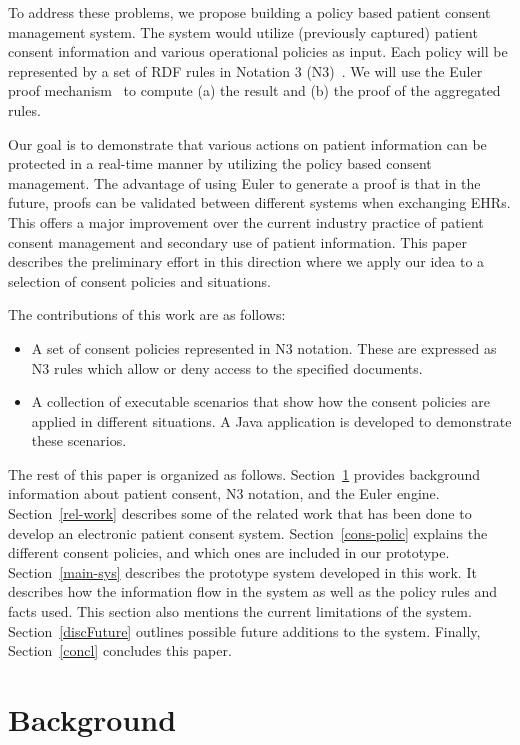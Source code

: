 \documentclass[conference]{IEEEtran}
\begin{document}
To address these problems, we propose building a policy based patient consent management system. The system would utilize (previously captured) patient consent
information and various operational policies as input. Each policy will be represented by a set of RDF rules in Notation 3 (N3)~\cite{N3not}.  We will use the
Euler proof mechanism~\cite{eurlorprf} to compute (a) the result and (b) the proof of the aggregated rules.  


Our goal is to demonstrate that various actions on patient information can be protected in a real-time manner by utilizing the policy based consent management.
The advantage of using Euler to generate a proof is that in the future, proofs can be validated between different systems when exchanging EHRs. This offers a
major improvement over the current industry practice of patient consent management and secondary use of patient information. This paper describes the
preliminary effort in this direction where we apply our idea to a selection of consent policies and situations.


The contributions of this work are as follows: 

\begin{itemize}
    \item A set of consent policies represented in N3 notation. These are expressed as N3 rules which allow or deny access to the specified documents.

\item A collection of executable scenarios that show how the consent policies are applied in different situations. A Java application is developed to
demonstrate these scenarios.
\end{itemize}

The rest of this paper is organized as follows. Section~\ref{bg-sec} provides background information about patient consent, N3 notation, and the Euler engine.
Section~\ref{rel-work} describes some of the related work that has been done to develop an electronic patient consent system. Section~\ref{cons-polic} explains
the different consent policies, and which ones are included in our prototype. Section~\ref{main-sys} describes the prototype system developed in this
work. It describes how the information flow in the system as well as the policy rules and facts used. This section also mentions the current limitations of the
system. Section~\ref{discFuture} outlines possible future additions to the system. Finally, Section~\ref{concl} concludes this paper.


\section{Background}
\label{bg-sec}
\end{document}
